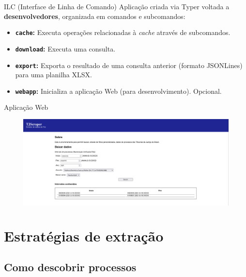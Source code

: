 \begin{frame}{ILC (Interface de Linha de Comando)}
    Aplicação criada via Typer voltada a \textbf{desenvolvedores}, organizada
    em comandos e subcomandos:

    \begin{itemize}
        \item \textbf{\texttt{cache}:} Executa operações relacionadas à
            \textit{cache} através de subcomandos.
        \item \textbf{\texttt{download}:} Executa uma consulta.
        \item \textbf{\texttt{export}:} Exporta o resultado de uma consulta
            anterior (formato JSONLines) para uma planilha XLSX.
        \item \textbf{\texttt{webapp}:} Inicializa a aplicação Web (para
            desenvolvimento). Opcional.
    \end{itemize}
\end{frame}

\begin{frame}{Aplicação Web}
    \begin{figure}[H]
        \centering
        \includegraphics[keepaspectratio,width=1\textwidth]{img/tjscraper-webapp-1}
    \end{figure}
\end{frame}

\section{Estratégias de extração}

\subsection{Como descobrir processos}

